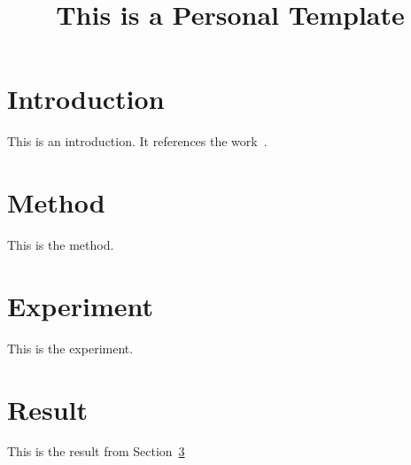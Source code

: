 \documentclass{article}
\begin{document}
\title{This is a Personal \LaTeXe{} Template}
\maketitle

\section{Introduction}
\label{sec:intr}
This is an introduction. It references the work~\cite{shannon2001mathematical}.

\section{Method}
\label{sec:exp}
This is the method.

\section{Experiment}
\label{sec:exp}
This is the experiment.

\section{Result}
\label{sec:result}
This is the result from Section~\ref{sec:exp}

% 


\end{document}
